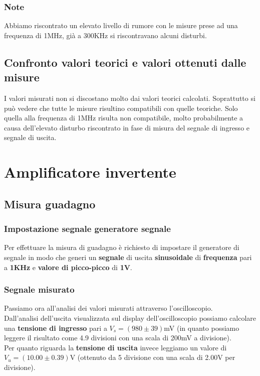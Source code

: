 \documentclass{article}
\begin{document}
\subsubsection{Note}
Abbiamo riscontrato un elevato livello di rumore con le misure prese ad una frequenza di 1MHz, già a 300KHz si riscontravano alcuni disturbi.

\subsection{Confronto valori teorici e valori ottenuti dalle misure}
I valori misurati non si discostano molto dai valori teorici calcolati. Soprattutto si può vedere che tutte le misure risultino compatibili con quelle teoriche. Solo quella alla frequenza di 1MHz risulta non compatibile, molto probabilmente a causa dell'elevato disturbo riscontrato in fase di misura del segnale di ingresso e segnale di uscita.

\section{Amplificatore invertente}
\normalsize
\subsection{Misura guadagno}
\subsubsection{Impostazione segnale generatore segnale}
Per effettuare la misura di guadagno è richiesto di impostare il generatore di segnale in modo che generi un \textbf{segnale} di uscita \textbf{sinusoidale} di \textbf{frequenza} pari a \textbf{1KHz} e \textbf{valore di picco-picco} di \textbf{1V}.

\subsubsection{Segnale misurato}
Passiamo ora all'analisi dei valori misurati attraverso l'oscilloscopio.\\Dall'analisi dell'uscita visualizzata sul display dell'oscilloscopio possiamo calcolare una \textbf{tensione di ingresso} pari a \large $V_s = (980 \pm 39)$mV \normalsize (in quanto possiamo leggere il risultato come 4.9 divisioni con una scala di 200mV a divisione).\\
Per quanto riguarda la \textbf{tensione di uscita} invece leggiamo un valore di \large $V_u = (10.00 \pm 0.39)$V \normalsize (ottenuto da 5 divisione con una scala di 2.00V per divisione).
\end{document}
